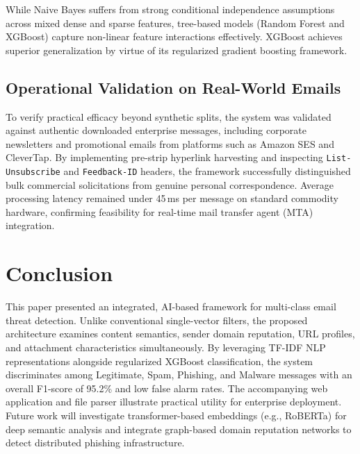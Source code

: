 \documentclass[conference]{IEEEtran}
\begin{document}
While Naive Bayes suffers from strong conditional independence assumptions across mixed dense and sparse features, tree-based models (Random Forest and XGBoost) capture non-linear feature interactions effectively. XGBoost achieves superior generalization by virtue of its regularized gradient boosting framework.

\subsection{Operational Validation on Real-World Emails}
To verify practical efficacy beyond synthetic splits, the system was validated against authentic downloaded enterprise messages, including corporate newsletters and promotional emails from platforms such as Amazon SES and CleverTap. By implementing pre-strip hyperlink harvesting and inspecting \texttt{List-Unsubscribe} and \texttt{Feedback-ID} headers, the framework successfully distinguished bulk commercial solicitations from genuine personal correspondence. Average processing latency remained under 45\,ms per message on standard commodity hardware, confirming feasibility for real-time mail transfer agent (MTA) integration.

\section{Conclusion}
\label{sec:conclusion}
This paper presented an integrated, AI-based framework for multi-class email threat detection. Unlike conventional single-vector filters, the proposed architecture examines content semantics, sender domain reputation, URL profiles, and attachment characteristics simultaneously. By leveraging TF-IDF NLP representations alongside regularized XGBoost classification, the system discriminates among Legitimate, Spam, Phishing, and Malware messages with an overall F1-score of 95.2\% and low false alarm rates. The accompanying web application and file parser illustrate practical utility for enterprise deployment. Future work will investigate transformer-based embeddings (e.g., RoBERTa) for deep semantic analysis and integrate graph-based domain reputation networks to detect distributed phishing infrastructure.
\end{document}
